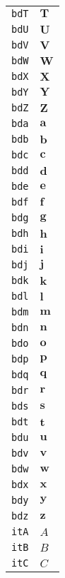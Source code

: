 \begin{longtable}{ll}
\texttt{bdT}&${}{\textbf{T}}{}$\\
\texttt{bdU}&${}{\textbf{U}}{}$\\
\texttt{bdV}&${}{\textbf{V}}{}$\\
\texttt{bdW}&${}{\textbf{W}}{}$\\
\texttt{bdX}&${}{\textbf{X}}{}$\\
\texttt{bdY}&${}{\textbf{Y}}{}$\\
\texttt{bdZ}&${}{\textbf{Z}}{}$\\
\texttt{bda}&${}{\textbf{a}}{}$\\
\texttt{bdb}&${}{\textbf{b}}{}$\\
\texttt{bdc}&${}{\textbf{c}}{}$\\
\texttt{bdd}&${}{\textbf{d}}{}$\\
\texttt{bde}&${}{\textbf{e}}{}$\\
\texttt{bdf}&${}{\textbf{f}}{}$\\
\texttt{bdg}&${}{\textbf{g}}{}$\\
\texttt{bdh}&${}{\textbf{h}}{}$\\
\texttt{bdi}&${}{\textbf{i}}{}$\\
\texttt{bdj}&${}{\textbf{j}}{}$\\
\texttt{bdk}&${}{\textbf{k}}{}$\\
\texttt{bdl}&${}{\textbf{l}}{}$\\
\texttt{bdm}&${}{\textbf{m}}{}$\\
\texttt{bdn}&${}{\textbf{n}}{}$\\
\texttt{bdo}&${}{\textbf{o}}{}$\\
\texttt{bdp}&${}{\textbf{p}}{}$\\
\texttt{bdq}&${}{\textbf{q}}{}$\\
\texttt{bdr}&${}{\textbf{r}}{}$\\
\texttt{bds}&${}{\textbf{s}}{}$\\
\texttt{bdt}&${}{\textbf{t}}{}$\\
\texttt{bdu}&${}{\textbf{u}}{}$\\
\texttt{bdv}&${}{\textbf{v}}{}$\\
\texttt{bdw}&${}{\textbf{w}}{}$\\
\texttt{bdx}&${}{\textbf{x}}{}$\\
\texttt{bdy}&${}{\textbf{y}}{}$\\
\texttt{bdz}&${}{\textbf{z}}{}$\\
\texttt{itA}&${}{\textit{A}}{}$\\
\texttt{itB}&${}{\textit{B}}{}$\\
\texttt{itC}&${}{\textit{C}}{}$\\

\end{longtable}
